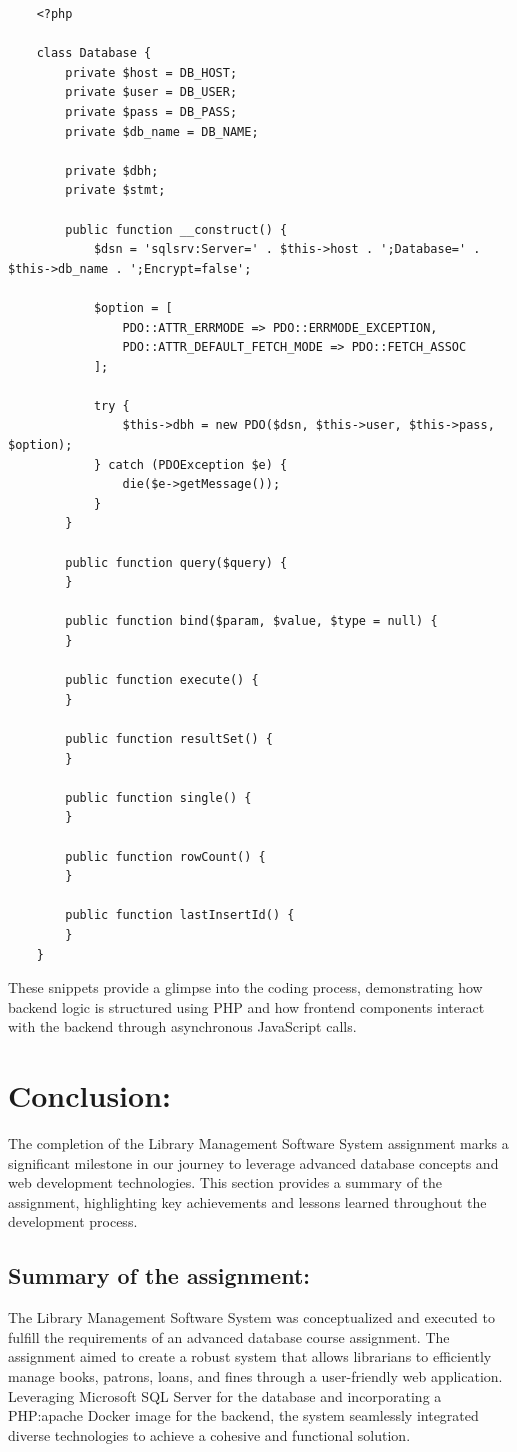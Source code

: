 \documentclass[12pt,titlepage,a4paper]{report}
\begin{document}
\begin{verbatim}
    <?php

    class Database {
        private $host = DB_HOST;
        private $user = DB_USER;
        private $pass = DB_PASS;
        private $db_name = DB_NAME;

        private $dbh;
        private $stmt;

        public function __construct() {
            $dsn = 'sqlsrv:Server=' . $this->host . ';Database=' . $this->db_name . ';Encrypt=false';

            $option = [
                PDO::ATTR_ERRMODE => PDO::ERRMODE_EXCEPTION,
                PDO::ATTR_DEFAULT_FETCH_MODE => PDO::FETCH_ASSOC
            ];

            try {
                $this->dbh = new PDO($dsn, $this->user, $this->pass, $option);
            } catch (PDOException $e) {
                die($e->getMessage());
            }
        }

        public function query($query) {
        }

        public function bind($param, $value, $type = null) {
        }

        public function execute() {
        }

        public function resultSet() {
        }

        public function single() {
        }

        public function rowCount() {
        }

        public function lastInsertId() {
        }
    }
\end{verbatim}
These snippets provide a glimpse into the coding process, demonstrating how backend logic is structured using PHP and how frontend components interact with the backend through asynchronous JavaScript calls.

\chapter{Conclusion:}
The completion of the Library Management Software System assignment marks a significant milestone in our journey to leverage advanced database concepts and web development technologies. This section provides a summary of the assignment, highlighting key achievements and lessons learned throughout the development process.

\section{Summary of the assignment:}
The Library Management Software System was conceptualized and executed to fulfill the requirements of an advanced database course assignment. The assignment aimed to create a robust system that allows librarians to efficiently manage books, patrons, loans, and fines through a user-friendly web application. Leveraging Microsoft SQL Server for the database and incorporating a PHP:apache Docker image for the backend, the system seamlessly integrated diverse technologies to achieve a cohesive and functional solution.
\end{document}

